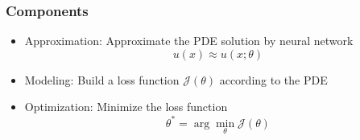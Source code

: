 \documentclass[aspectratio=169]{beamer}
\begin{document}
\begin{frame}
\frametitle{Components}

\begin{itemize}
	\item Approximation: Approximate the PDE solution by neural network
	\begin{equation*}
	u(x) \approx u(x;\theta)
	\end{equation*}
	\item Modeling: Build a loss function $\mathcal{J} (\theta)$ according to the PDE
	\item Optimization: Minimize the loss function
	\begin{equation*}
	\theta^* = \arg\min_{\theta} \mathcal{J} (\theta)
	\end{equation*}
\end{itemize}
\end{frame}
\end{document}
